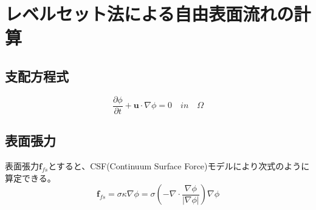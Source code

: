 \documentclass[8pt,a4paper]{article}
\newcommand{\bm}{\boldsymbol}
\begin{document}

\section{レベルセット法による自由表面流れの計算}
\subsection{支配方程式}
\begin{equation}
	\frac{\partial \phi}{\partial t} + \bm{u} \cdot \nabla \phi = 0 \quad in \quad \Omega
\end{equation}

\subsection{表面張力}
表面張力$\bm{f}_{fs}$とすると、CSF(Continuum Surface Force)モデルにより次式のように算定できる。
\begin{equation}
	\bm{f}_{fs} = \sigma \kappa \nabla \phi
							= \sigma (-\nabla \cdot \frac{\nabla \phi}{|\nabla \phi|}) \nabla \phi
\end{equation}
\end{document}
